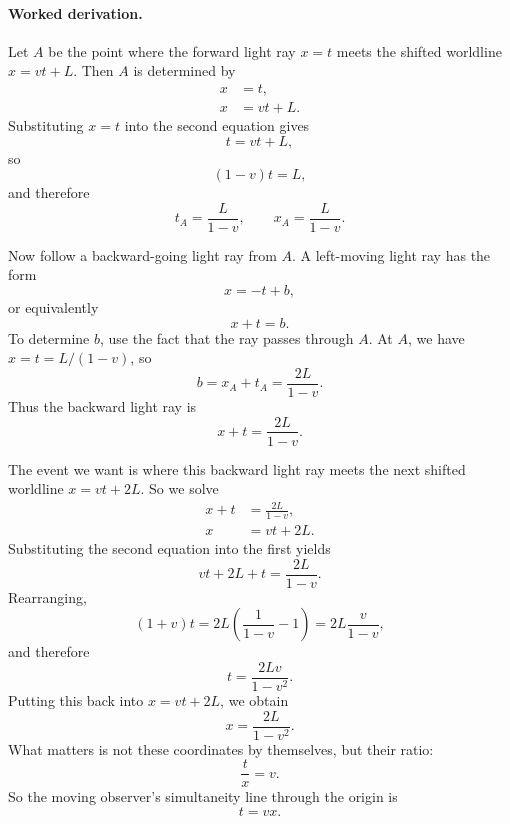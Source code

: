 \paragraph{Worked derivation.} Let \(A\) be the point where the forward light ray \(x=t\) meets the shifted worldline \(x=vt+L\). Then \(A\) is determined by
\begin{align}
x &= t, \\
x &= vt+L.
\end{align}
Substituting \(x=t\) into the second equation gives
\begin{equation}
t=vt+L,
\end{equation}
so
\begin{equation}
(1-v)t=L,
\end{equation}
and therefore
\begin{equation}
t_A=\frac{L}{1-v},\qquad x_A=\frac{L}{1-v}.
\end{equation}

Now follow a backward-going light ray from \(A\). A left-moving light ray has the form
\begin{equation}
x=-t+b,
\end{equation}
or equivalently
\begin{equation}
x+t=b.
\end{equation}
To determine \(b\), use the fact that the ray passes through \(A\). At \(A\), we have \(x=t=L/(1-v)\), so
\begin{equation}
b=x_A+t_A=\frac{2L}{1-v}.
\end{equation}
Thus the backward light ray is
\begin{equation}
x+t=\frac{2L}{1-v}.
\end{equation}

The event we want is where this backward light ray meets the next shifted worldline \(x=vt+2L\). So we solve
\begin{align}
x+t &= \frac{2L}{1-v}, \\
x &= vt+2L.
\end{align}
Substituting the second equation into the first yields
\begin{equation}
vt+2L+t=\frac{2L}{1-v}.
\end{equation}
Rearranging,
\begin{equation}
(1+v)t=2L\left(\frac{1}{1-v}-1\right)=2L\frac{v}{1-v},
\end{equation}
and therefore
\begin{equation}
t=\frac{2Lv}{1-v^2}.
\end{equation}
Putting this back into \(x=vt+2L\), we obtain
\begin{equation}
x=\frac{2L}{1-v^2}.
\end{equation}
What matters is not these coordinates by themselves, but their ratio:
\begin{equation}
\frac{t}{x}=v.
\end{equation}
So the moving observer's simultaneity line through the origin is
\begin{equation}
t=vx.
\end{equation}

